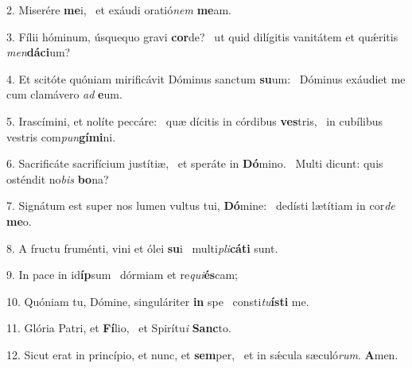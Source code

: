 2. Miserére \textbf{me}i, \ast\  et exáudi oratió\textit{nem} \textbf{me}am.\

3. Fílii hóminum, úsquequo gravi \textbf{cor}de? \ast\  ut quid dilígitis vanitátem et quǽritis \textit{men}\textbf{dá}\textbf{ci}um?\

4. Et scitóte quóniam mirificávit Dóminus sanctum \textbf{su}um: \ast\  Dóminus exáudiet me cum clamávero \textit{ad} \textbf{e}um.\

5. Irascímini, et nolíte peccáre: \dag\  quæ dícitis in córdibus \textbf{ves}tris, \ast\  in cubílibus vestris com\textit{pun}\textbf{gí}\textbf{mi}ni.\

6. Sacrificáte sacrifícium justítiæ, \dag\  et speráte in \textbf{Dó}mino. \ast\  Multi dicunt: quis osténdit no\textit{bis} \textbf{bo}na?\

7. Signátum est super nos lumen vultus tui, \textbf{Dó}mine: \ast\  dedísti lætítiam in cor\textit{de} \textbf{me}o.\

8. A fructu fruménti, vini et ólei \textbf{su}i \ast\  multi\textit{pli}\textbf{cá}\textbf{ti} sunt.\

9. In pace in id\textbf{íp}sum \ast\  dórmiam et re\textit{qui}\textbf{és}cam;\

10. Quóniam tu, Dómine, singuláriter \textbf{in} spe \ast\  consti\textit{tu}\textbf{ís}\textbf{ti} me.\

11. Glória Patri, et \textbf{Fí}lio, \ast\  et Spirítu\textit{i} \textbf{Sanc}to.\

12. Sicut erat in princípio, et nunc, et \textbf{sem}per, \ast\  et in sǽcula sæculó\textit{rum}. \textbf{A}men.\

